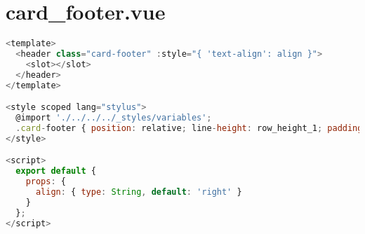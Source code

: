 \section{card\_footer.vue}


\begin{lstlisting}[language=JavaScript]
<template>
  <header class="card-footer" :style="{ 'text-align': align }">
    <slot></slot>
  </header>
</template>

<style scoped lang="stylus">
  @import './../../../_styles/variables';
  .card-footer { position: relative; line-height: row_height_1; padding: 2px 0 5px; border-top: 1px solid light_gray_1; margin-top: 10px; }
</style>

<script>
  export default {
    props: {
      align: { type: String, default: 'right' }
    }
  };
</script>
\end{lstlisting}



\begin{lstlisting}[language=JavaScript]

\end{lstlisting}



\begin{lstlisting}[language=JavaScript]

\end{lstlisting}




\begin{lstlisting}[language=JavaScript]

\end{lstlisting}



\begin{lstlisting}[language=JavaScript]

\end{lstlisting}



\begin{lstlisting}[language=JavaScript]

\end{lstlisting}




\begin{lstlisting}[language=JavaScript]

\end{lstlisting}



\begin{lstlisting}[language=JavaScript]

\end{lstlisting}



